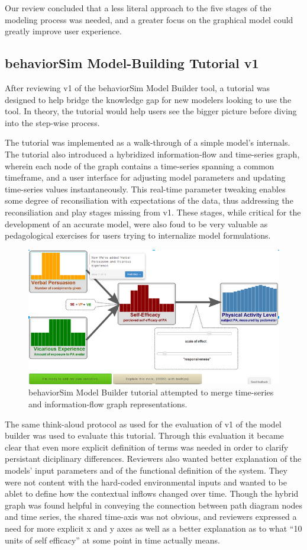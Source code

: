 \documentclass[conference]{IEEEtran}
\begin{document}
Our review concluded that a less literal approach to the five stages of the modeling process was needed, and a greater focus on the graphical model could greatly improve user experience.

\subsection{behaviorSim Model-Building Tutorial v1}
After reviewing v1 of the behaviorSim Model Builder tool, a tutorial was designed to help bridge the knowledge gap for new modelers looking to use the tool.
In theory, the tutorial would help users see the bigger picture before diving into the step-wise process.

The tutorial was implemented as a walk-through of a simple model's internals.
The tutorial also introduced a hybridized information-flow and time-series graph, wherein each node of the graph contains a time-series spanning a common timeframe, and a user interface for adjusting model parameters and updating time-series values instantaneously.
This real-time parameter tweaking enables some degree of reconsiliation with expectations of the data, thus addressing the reconsiliation and play stages missing from v1.
These stages, while critical for the development of an accurate model, were also foud to be very valuable as pedagological exercises for users trying to internalize model formulations.
 
\begin{figure}[!t]
  \centering
  \includegraphics[width=0.9\columnwidth]{img/v1-flow}  
  \caption{behaviorSim Model Builder tutorial attempted to merge time-series and information-flow graph representations.}
  \label{model-builder-tutorial}
\end{figure}

The same think-aloud protocol as used for the evaluation of v1 of the model builder was used to evaluate this tutorial. 
Through this evaluation it became clear that even more explicit definition of terms was needed in order to clarify persistant diciplinary differences.
Reviewers also wanted better explanation of the models' input parameters and of the functional definition of the system.
They were not content with the hard-coded environmental inputs and wanted to be ablet to define how the contextual inflows changed over time.
Though the hybrid graph was found helpful in conveying the connection between path diagram nodes and time series, the shared time-axis was not obvious, and reviewers expressed a need for more explicit x and y axes as well as a better explanation as to what ``10 units of self efficacy'' at some point in time actually means.
\end{document}
